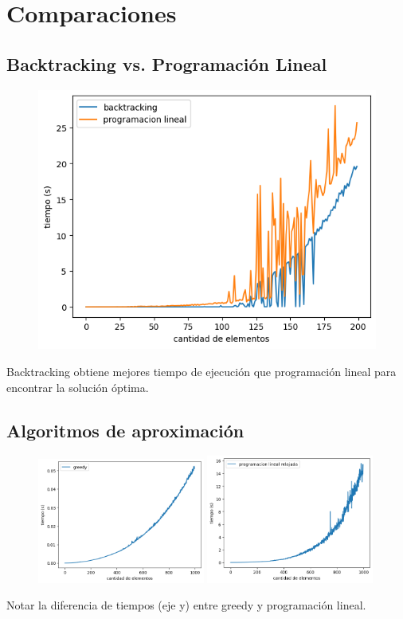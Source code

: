 \section{Comparaciones}

\subsection{Backtracking vs. Programación Lineal}

\begin{figure}[H]
    \centering
    \includegraphics[width=1\textwidth]{img/backvslp.png}
\end{figure}

Backtracking obtiene mejores tiempo de ejecución que programación lineal para
encontrar la solución óptima.

\subsection{Algoritmos de aproximaci\'on}

\begin{figure}[H]
    \centering
    \includegraphics[width=0.49\textwidth]{img/greedy.png}
    \includegraphics[width=0.49\textwidth]{img/pl_rlx.png}
\end{figure}

Notar la diferencia de tiempos (eje y) entre greedy y programación lineal.
